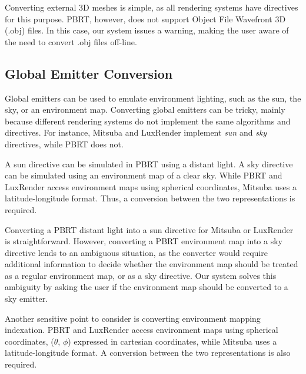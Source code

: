 Converting external 3D meshes is simple, as all rendering systems have directives for this purpose. PBRT, however, does not support Object File Wavefront 3D
(.obj) files. In this case, our system issues a warning, making the user aware of the need to convert .obj files off-line.

\subsection{Global Emitter Conversion}
Global emitters can be used to emulate environment lighting, such as the sun, the sky, or an environment map. Converting global emitters can be tricky, mainly
because different rendering systems do not implement the same algorithms and directives. For instance, Mitsuba and LuxRender implement {\it sun} and {\it sky} directives, while PBRT does not.

A sun directive can be simulated in PBRT using a distant light. A sky directive can be simulated using an environment map of a clear sky. While PBRT and LuxRender access environment maps using spherical coordinates, Mitsuba uses a latitude-longitude format. Thus, a conversion between the two representations is required. 
  
Converting a PBRT distant light into a sun directive for Mitsuba or LuxRender is straightforward. However, converting a PBRT environment map into a sky directive lends to an ambiguous situation, as the converter would require additional information to decide whether the environment map should be treated as a regular environment map, or as a sky directive. Our system solves this ambiguity by asking the user if the environment map should be converted to a sky
emitter.

Another sensitive point to consider is converting environment mapping indexation. PBRT and LuxRender access environment maps using spherical coordinates, 
($\theta$, $\phi$) expressed in cartesian coordinates, while Mitsuba uses a latitude-longitude format. A conversion between the two representations is also required. 

